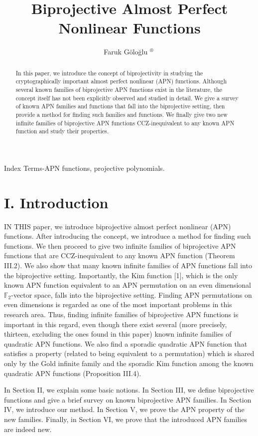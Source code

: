 \documentclass[10pt]{article}
\title{Biprojective Almost Perfect Nonlinear Functions }
\author{Faruk Göloğlu ${ }^{\text {® }}$}
\date{}
\begin{document}
\maketitle
\captionsetup{singlelinecheck=false}


\begin{abstract}
In this paper, we introduce the concept of biprojectivity in studying the cryptographically important almost perfect nonlinear (APN) functions. Although several known families of biprojective APN functions exist in the literature, the concept itself has not been explicitly observed and studied in detail. We give a survey of known APN families and functions that fall into the biprojective setting, then provide a method for finding such families and functions. We finally give two new infinite families of biprojective APN functions CCZ-inequivalent to any known APN function and study their properties.
\end{abstract}

Index Terms-APN functions, projective polynomials.

\section*{I. Introduction}
IN THIS paper, we introduce biprojective almost perfect nonlinear (APN) functions. After introducing the concept, we introduce a method for finding such functions. We then proceed to give two infinite families of biprojective APN functions that are CCZ-inequivalent to any known APN function (Theorem III.2). We also show that many known infinite families of APN functions fall into the biprojective setting. Importantly, the Kim function [1], which is the only known APN function equivalent to an APN permutation on an even dimensional $\mathbb{F}_{2}$-vector space, falls into the biprojective setting. Finding APN permutations on even dimensions is regarded as one of the most important problems in this research area. Thus, finding infinite families of biprojective APN functions is important in this regard, even though there exist several (more precisely, thirteen, excluding the ones found in this paper) known infinite families of quadratic APN functions. We also find a sporadic quadratic APN function that satisfies a property (related to being equivalent to a permutation) which is shared only by the Gold infinite family and the sporadic Kim function among the known quadratic APN functions (Proposition III.4).

In Section II, we explain some basic notions. In Section III, we define biprojective functions and give a brief survey on known biprojective APN families. In Section IV, we introduce our method. In Section V, we prove the APN property of the new families. Finally, in Section VI, we prove that the introduced APN families are indeed new.
\end{document}
